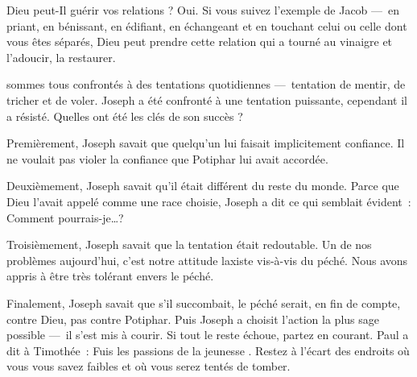 Dieu peut-Il guérir vos relations ? Oui. Si vous suivez l'exemple de Jacob
 ---~en priant, en bénissant, en édifiant, en échangeant et en touchant
 celui ou celle dont vous êtes séparés, Dieu peut prendre cette relation
 qui a tourné au vinaigre et l'adoucir, la restaurer. 

\dvrule






 sommes tous confrontés à des tentations quotidiennes
 ---~tentation de mentir, de tricher et de voler.
 Joseph a été confronté à une tentation puissante,
 cependant il a résisté.
 Quelles ont été les clés de son succès ? 

Premièrement, Joseph savait que quelqu'un lui faisait implicitement confiance.
 Il ne voulait pas violer la confiance que Potiphar lui avait accordée. 

Deuxièmement, Joseph savait qu'il était différent du reste du monde.
 Parce que Dieu l'avait appelé comme une race choisie,
 Joseph a dit ce qui semblait évident~: \og Comment pourrais-je\dots{}?\fg{}

Troisièmement, Joseph savait que la tentation était redoutable.
 Un de nos problèmes aujourd'hui, c'est notre attitude laxiste
 vis-à-vis du péché.
 Nous avons appris à être très tolérant envers le péché. 

Finalement, Joseph savait que s'il succombait, le péché serait,
 en fin de compte, contre Dieu, pas contre Potiphar.
 Puis Joseph a choisit l'action la plus sage possible
 ---~il s'est mis à courir.
 Si tout le reste échoue, partez en courant.
 Paul a dit à Timothée~:
 \og Fuis les passions de la jeunesse \fg{}.
 Restez à l'écart des endroits où vous vous savez faibles
 et où vous serez tentés de tomber. 


